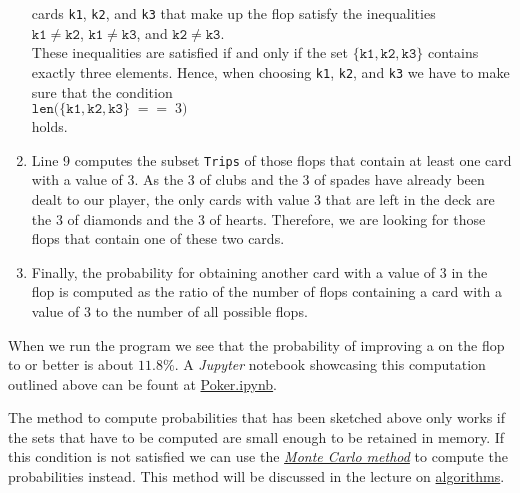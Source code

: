 \begin{enumerate}
      cards \texttt{k1}, \texttt{k2}, and \texttt{k3} that make up the flop satisfy the inequalities 
      \\[0.2cm]
      \hspace*{1.3cm}
      $\mathtt{k1} \not= \mathtt{k2}$, \quad $\mathtt{k1} \not= \mathtt{k3}$,  \quad and \quad $\mathtt{k2} \not= \mathtt{k3}$.
      \\[0.2cm]
      These inequalities are satisfied if and only if the set 
      $\{ \mathtt{k1}, \mathtt{k2}, \mathtt{k3} \}$ contains exactly three elements.  Hence, when
      choosing \texttt{k1}, \texttt{k2}, and \texttt{k3} we have to make sure that the condition
      \\[0.2cm]
      \hspace*{1.3cm}
      $\texttt{len}\bigl({\{ \mathtt{k1}, \mathtt{k2}, \mathtt{k3} \} \;\mathtt{==}\; 3 }\bigr)$
      \\[0.2cm]
      holds.
\item Line 9 computes the subset \texttt{Trips} of those flops that contain at least one card with a value of 3.
      As the 3 of clubs and the 3 of spades have already been dealt to our player, the only cards
      with value 3 that are left in the deck are the 3 of diamonds and the 3 of hearts.  Therefore, we are looking for
      those flops that contain one of these two cards.
\item Finally, the probability for obtaining another card with a value of 3 in the flop is computed as
      the ratio of the number of flops containing a card with a value of 3 to the number of all possible flops.
\end{enumerate}
When we run the program we see that the probability of improving a  on the flop to  or better
is about  $11.8\%$.  A \textsl{Jupyter} notebook showcasing this computation outlined above can be fount at
\href{https://github.com/karlstroetmann/Logik/blob/master/Python/Poker.ipynb}{Poker.ipynb}.

\remarkEng
The method to compute probabilities that has been sketched above only works if the sets that have to
be computed are small enough to be retained in memory.  If this condition is
not satisfied we can use the \href{https://en.wikipedia.org/wiki/Monte_Carlo_method}{\emph{Monte Carlo method}} 
to compute the probabilities instead.  This method will be discussed in the lecture on 
\href{https://github.com/karlstroetmann/Algorithms/blob/master/Lecture-Notes/algorithms.pdf}{algorithms}.


